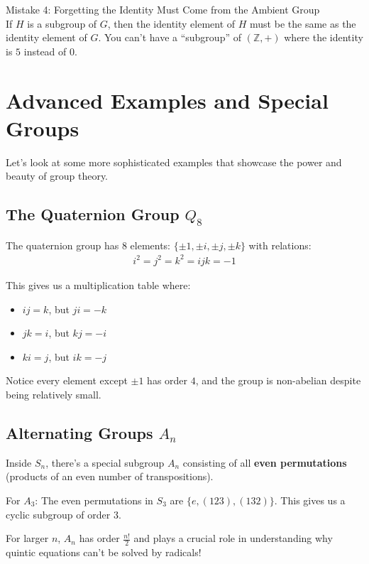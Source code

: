 \documentclass[12pt]{article}
\begin{document}
Mistake 4: Forgetting the Identity Must Come from the Ambient Group \\
If $H$ is a subgroup of $G$, then the identity element of $H$ must be the same as the identity element of $G$. You can't have a ``subgroup'' of $(\mathbb{Z}, +)$ where the identity is $5$ instead of $0$.

\section{\textcolor{SectionColor}{Advanced Examples and Special Groups}}

Let's look at some more sophisticated examples that showcase the power and beauty of group theory.

\subsection{\textcolor{HeaderColor}{The Quaternion Group $Q_8$}}

\begin{examplebox}
The quaternion group has 8 elements: $\{±1, ±i, ±j, ±k\}$ with relations:
\begin{align}
i^2 = j^2 = k^2 = ijk = -1
\end{align}

This gives us a multiplication table where:
\begin{itemize}
\item $ij = k$, but $ji = -k$
\item $jk = i$, but $kj = -i$  
\item $ki = j$, but $ik = -j$
\end{itemize}

Notice every element except $±1$ has order $4$, and the group is non-abelian despite being relatively small.
\end{examplebox}

\subsection{\textcolor{HeaderColor}{Alternating Groups $A_n$}}

\begin{examplebox}
Inside $S_n$, there's a special subgroup $A_n$ consisting of all \textbf{even permutations} (products of an even number of transpositions).

For $A_3$: The even permutations in $S_3$ are $\{e, (123), (132)\}$. This gives us a cyclic subgroup of order $3$.

For larger $n$, $A_n$ has order $\frac{n!}{2}$ and plays a crucial role in understanding why quintic equations can't be solved by radicals!
\end{examplebox}
\end{document}

